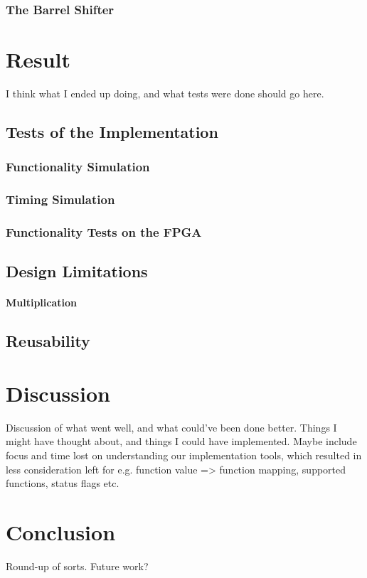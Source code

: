 \documentclass{article}
\begin{document}
\subsubsection{The Barrel Shifter}
\label{subsubsec:barrelshifter}


\section{Result}
\label{sec:result}
I think what I ended up doing, and what tests were done should go here.
\subsection{Tests of the Implementation}
\label{sec:tests}

\subsubsection{Functionality Simulation}
\label{subsec:funcsim}

\subsubsection{Timing Simulation}
\label{subsec:timingsim}

\subsubsection{Functionality Tests on the FPGA}
\label{subsec:funcfpga}

\subsection{Design Limitations}
\label{subsec:limitations}
\paragraph{Multiplication}

\subsection{Reusability}
\label{subsec:reusability}

\section{Discussion}
\label{sec:discussion}
Discussion of what went well, and what could've been done better. Things I might have thought about, and things I could have implemented. Maybe include focus and time lost on understanding our implementation tools, which resulted in less consideration left for e.g. function value => function mapping, supported functions, status flags etc.

\section{Conclusion}
\label{sec:conclusion}
Round-up of sorts. Future work?
\end{document}
